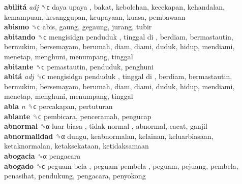\textbf{abilitá} \emph{adj}  ␝ϲ   daya upaya , bakat, kebolehan, kecekapan, kehandalan, kemampuan, kesanggupan, keupayaan, kuasa, pembawaan  \\
\textbf{abismo} ␝ϲ  abis, gaung, gegaung, jurang, tubir  \\
\textbf{abitando} ␝ϲ   mengisidgn penduduk ,  tinggal di , berdiam, bermastautin, bermukim, bersemayam, berumah, diam, diami, duduk, hidup, mendiami, menetap, menghuni, menumpang, tinggal  \\
\textbf{abitante} ␝ϲ  pemastautin, penduduk, penghuni  \\
\textbf{abitá} \emph{adj}  ␝ϲ   mengisidgn penduduk ,  tinggal di , berdiam, bermastautin, bermukim, bersemayam, berumah, diam, diami, duduk, hidup, mendiami, menetap, menghuni, menumpang, tinggal  \\
\textbf{abla} \emph{n}  ␝ϲ  percakapan, pertuturan  \\
\textbf{ablante} ␝ϲ  pembicara, penceramah, pengucap  \\
\textbf{abnormal} ␝α   luar biasa ,  tidak normal , abnormal, cacat, ganjil  \\
\textbf{abnormalidad} ␝α  dungu, keabnormalan, kelainan, keluarbiasaan, ketaknormalan, ketaksekataan, ketidaksamaan  \\
\textbf{abogacia} ␝α  pengacara  \\
\textbf{abogado} ␝ϲ   peguam bela ,  peguam pembela , peguam, pejuang, pembela, penasihat, pendukung, pengacara, penyokong  \\
